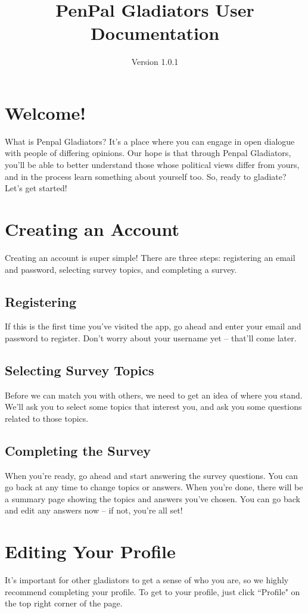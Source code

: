 \documentclass[12pt]{article}
\title{PenPal Gladiators User Documentation}
\author{Version 1.0.1}
\begin{document}
\maketitle
\tableofcontents

\section{Welcome!}
What is Penpal Gladiators? It's a place where you can engage in open dialogue
with people of differing opinions. Our hope is that through Penpal Gladiators,
you'll be able to better understand those whose political views differ from
yours, and in the process learn something about yourself too. So, ready to
gladiate? Let's get started!

\section{Creating an Account}
Creating an account is super simple! There are three steps: registering an email
and password, selecting survey topics, and completing a survey.

\subsection{Registering}
If this is the first time you've visited the app, go ahead and enter your email
and password to register.  Don't worry about your username yet -- that'll come
later.

\subsection{Selecting Survey Topics}
Before we can match you with others, we need to get an idea of where you stand.
We'll ask you to select some topics that interest you, and ask you some
questions related to those topics.

\subsection{Completing the Survey}
When you're ready, go ahead and start answering the survey questions. You can go
back at any time to change topics or answers. When you're done, there will be a
summary page showing the topics and answers you've chosen. You can go back and
edit any answers now – if not, you're all set!

\section{Editing Your Profile}
It's important for other gladiators to get a sense of who you are, so we highly
recommend completing your profile. To get to your profile, just click “Profile"
on the top right corner of the page.\\
\end{document}

